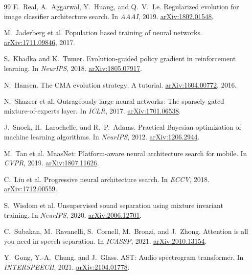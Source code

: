 \documentclass[10pt,twocolumn,letterpaper]{article}
\begin{document}
{\begin{thebibliography}{99}
E.~Real, A.~Aggarwal, Y.~Huang, and Q.~V.~Le.
\newblock Regularized evolution for image classifier architecture search.
\newblock In \emph{AAAI}, 2019.
\newblock \href{https://arxiv.org/abs/1802.01548}{arXiv:1802.01548}.

M.~Jaderberg et al.
\newblock Population based training of neural networks.
\newblock \href{https://arxiv.org/abs/1711.09846}{arXiv:1711.09846}, 2017.

S.~Khadka and K.~Tumer.
\newblock Evolution-guided policy gradient in reinforcement learning.
\newblock In \emph{NeurIPS}, 2018.
\newblock \href{https://arxiv.org/abs/1805.07917}{arXiv:1805.07917}.

N.~Hansen.
\newblock The CMA evolution strategy: A tutorial.
\newblock \href{https://arxiv.org/abs/1604.00772}{arXiv:1604.00772}, 2016.

N.~Shazeer et al.
\newblock Outrageously large neural networks: The sparsely-gated mixture-of-experts layer.
\newblock In \emph{ICLR}, 2017.
\newblock \href{https://arxiv.org/abs/1701.06538}{arXiv:1701.06538}.

J.~Snoek, H.~Larochelle, and R.~P.~Adams.
\newblock Practical Bayesian optimization of machine learning algorithms.
\newblock In \emph{NeurIPS}, 2012.
\newblock \href{https://arxiv.org/abs/1206.2944}{arXiv:1206.2944}.

M.~Tan et al.
\newblock MnasNet: Platform-aware neural architecture search for mobile.
\newblock In \emph{CVPR}, 2019.
\newblock \href{https://arxiv.org/abs/1807.11626}{arXiv:1807.11626}.

C.~Liu et al.
\newblock Progressive neural architecture search.
\newblock In \emph{ECCV}, 2018.
\newblock \href{https://arxiv.org/abs/1712.00559}{arXiv:1712.00559}.

S.~Wisdom et al.
\newblock Unsupervised sound separation using mixture invariant training.
\newblock In \emph{NeurIPS}, 2020.
\newblock \href{https://arxiv.org/abs/2006.12701}{arXiv:2006.12701}.

C.~Subakan, M.~Ravanelli, S.~Cornell, M.~Bronzi, and J.~Zhong.
\newblock Attention is all you need in speech separation.
\newblock In \emph{ICASSP}, 2021.
\newblock \href{https://arxiv.org/abs/2010.13154}{arXiv:2010.13154}.

Y.~Gong, Y.-A.~Chung, and J.~Glass.
\newblock AST: Audio spectrogram transformer.
\newblock In \emph{INTERSPEECH}, 2021.
\newblock \href{https://arxiv.org/abs/2104.01778}{arXiv:2104.01778}.


\end{thebibliography}}
\end{document}
